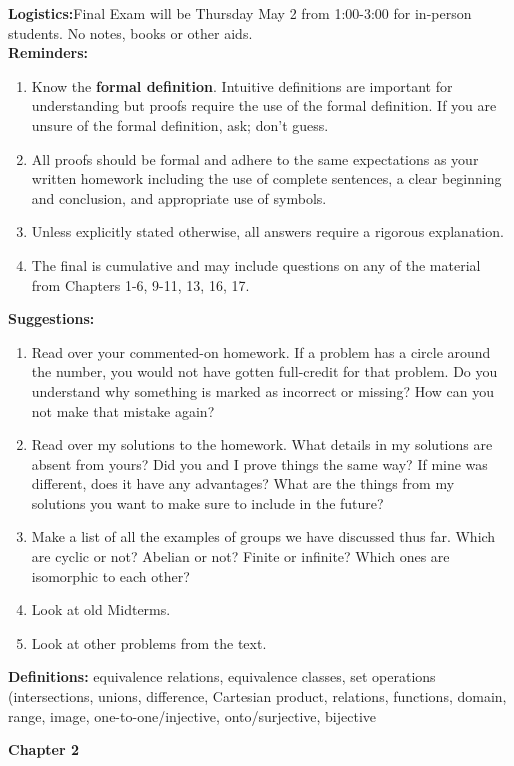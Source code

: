 \documentclass[12pt]{article}
\begin{document}
\textbf{Logistics:}Final Exam will be Thursday May 2 from 1:00-3:00 for in-person students. No notes, books or other aids.\\

\textbf{Reminders:}
\begin{enumerate}
	\item Know the \textbf{formal definition}. Intuitive definitions are important for understanding but proofs require the use of the formal definition. If you are unsure of the formal definition, ask; don't guess.
	\item All proofs should be formal and adhere to the same expectations as your written homework including the use of complete sentences, a clear beginning and conclusion, and appropriate use of symbols.
	\item Unless explicitly stated otherwise, all answers require a rigorous explanation.
	\item The final is cumulative and may include questions on any of the material from  Chapters 1-6, 9-11, 13, 16, 17.
\end{enumerate}

\textbf{Suggestions:}
\begin{enumerate}
	\item Read over your commented-on homework. If a problem has a circle around the number, you would not have gotten full-credit for that problem. Do you understand why something is marked as incorrect or missing? How can you not make that mistake again?
	\item Read over my solutions to the homework. What details in my solutions are absent from yours? Did you and I prove things the same way? If mine was different, does it have any advantages? What are the things from my solutions you want to make sure to include in the future?
	\item Make a list of all the examples of groups we have discussed thus far. Which are cyclic or not? Abelian or not? Finite or infinite? Which ones are isomorphic to each other?
	\item Look at old Midterms.
	\item Look at other problems from the text.
\end{enumerate}


\textbf{Definitions:} equivalence relations, equivalence classes, set operations (intersections, unions, difference, Cartesian product, relations, functions, domain, range, image, one-to-one/injective, onto/surjective, bijective


\noindent \textbf{Chapter 2}\\
\end{document}
